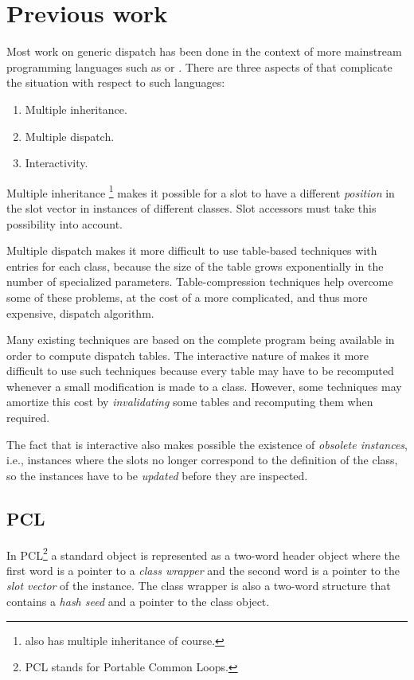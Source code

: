 \section{Previous work}

Most work on generic dispatch has been done in the context of more
mainstream programming languages such as \cplusplus{} or \java{}.
There are three aspects of \cl{} that complicate the situation with
respect to such languages:

\begin{enumerate}
\item Multiple inheritance.
\item Multiple dispatch.
\item Interactivity.
\end{enumerate}

Multiple inheritance%
\footnote{\cplusplus{} also has multiple inheritance of course.}
makes it possible for a slot to have a different \emph{position} in
the slot vector in instances of different classes.  Slot accessors
must take this possibility into account.

Multiple dispatch makes it more difficult to use table-based
techniques with entries for each class, because the size of the table
grows exponentially in the number of specialized parameters.
Table-compression techniques help overcome some of these problems, at
the cost of a more complicated, and thus more expensive, dispatch
algorithm. 

Many existing techniques are based on the complete program being
available in order to compute dispatch tables.  The interactive nature
of \cl{} makes it more difficult to use such techniques because every
table may have to be recomputed whenever a small modification is made
to a class.  However, some techniques may amortize this cost by
\emph{invalidating} some tables and recomputing them when required.

The fact that \cl{} is interactive also makes possible the
existence of \emph{obsolete instances}, i.e., instances where the
slots no longer correspond to the definition of the class, so the
instances have to be \emph{updated} before they are inspected.  

\subsection{PCL}

In PCL\footnote{PCL stands for Portable Common Loops.}
\cite{Kiczales:1990:EMD:91556.91600} a standard object is represented
as a two-word header object where the first word is a pointer to a
\emph{class wrapper} and the second word is a pointer to the
\emph{slot vector} of the instance.  The class wrapper is also a
two-word structure that contains a \emph{hash seed} and a pointer to
the class object. 

